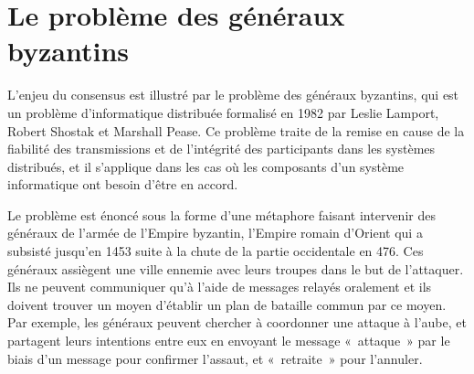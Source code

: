 \section*{Le problème des généraux byzantins} %


L'enjeu du consensus est illustré par le problème des généraux byzantins, qui est un problème d'informatique distribuée formalisé en 1982 par Leslie Lamport, Robert Shostak et Marshall Pease. Ce problème traite de la remise en cause de la fiabilité des transmissions et de l'intégrité des participants dans les systèmes distribués, et il s'applique dans les cas où les composants d'un système informatique ont besoin d'être en accord.

Le problème est énoncé sous la forme d'une métaphore faisant intervenir des généraux de l'armée de l'Empire byzantin, l'Empire romain d'Orient qui a subsisté jusqu'en 1453 suite à la chute de la partie occidentale en 476. Ces généraux assiègent une ville ennemie avec leurs troupes dans le but de l'attaquer. Ils ne peuvent communiquer qu'à l'aide de messages relayés oralement et ils doivent trouver un moyen d'établir un plan de bataille commun par ce moyen. Par exemple, les généraux peuvent chercher à coordonner une attaque à l'aube, et partagent leurs intentions entre eux en envoyant le message «~attaque~» par le biais d'un message pour confirmer l'assaut, et «~retraite~» pour l'annuler. %


